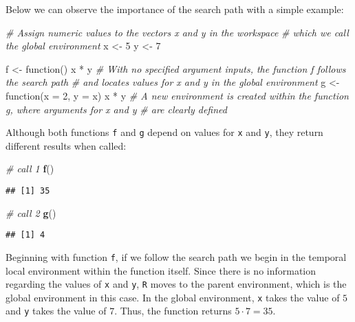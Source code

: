 \documentclass[11,]{article}
\newenvironment{Shaded}{\begin{snugshade}}{\end{snugshade}}
\newcommand{\KeywordTok}[1]{\textcolor[rgb]{0.13,0.29,0.53}{\textbf{{#1}}}}
\newcommand{\DataTypeTok}[1]{\textcolor[rgb]{0.13,0.29,0.53}{{#1}}}
\newcommand{\DecValTok}[1]{\textcolor[rgb]{0.00,0.00,0.81}{{#1}}}
\newcommand{\StringTok}[1]{\textcolor[rgb]{0.31,0.60,0.02}{{#1}}}
\newcommand{\CommentTok}[1]{\textcolor[rgb]{0.56,0.35,0.01}{\textit{{#1}}}}
\newcommand{\NormalTok}[1]{{#1}}
\begin{document}
Below we can observe the importance of the search path with a simple
example:

\begin{Shaded}
\begin{Highlighting}[]
\CommentTok{# Assign numeric values to the vectors x and y in the workspace }
\CommentTok{# which we call the global environment}
\NormalTok{x <-}\StringTok{ }\DecValTok{5}
\NormalTok{y <-}\StringTok{ }\DecValTok{7}

\NormalTok{f <-}\StringTok{ }\NormalTok{function() x *}\StringTok{ }\NormalTok{y}
  \CommentTok{# With no specified argument inputs, the function f follows the search path}
  \CommentTok{# and locates values for x and y in the global environment}
\NormalTok{g <-}\StringTok{ }\NormalTok{function(}\DataTypeTok{x =} \DecValTok{2}\NormalTok{, }\DataTypeTok{y =} \NormalTok{x) x *}\StringTok{ }\NormalTok{y}
  \CommentTok{# A new environment is created within the function g, where arguments for x and y}
  \CommentTok{# are clearly defined}
\end{Highlighting}
\end{Shaded}

Although both functions \texttt{f} and \texttt{g} depend on values for
\texttt{x} and \texttt{y}, they return different results when called:

\begin{Shaded}
\begin{Highlighting}[]
\CommentTok{# call 1}
\KeywordTok{f}\NormalTok{()}
\end{Highlighting}
\end{Shaded}

\begin{verbatim}
## [1] 35
\end{verbatim}

\begin{Shaded}
\begin{Highlighting}[]
\CommentTok{# call 2}
\KeywordTok{g}\NormalTok{()}
\end{Highlighting}
\end{Shaded}

\begin{verbatim}
## [1] 4
\end{verbatim}

Beginning with function \texttt{f}, if we follow the search path we
begin in the temporal local environment within the function itself.
Since there is no information regarding the values of \texttt{x} and
\texttt{y}, \texttt{R} moves to the parent environment, which is the
global environment in this case. In the global environment, \texttt{x}
takes the value of \(5\) and \texttt{y} takes the value of \(7\). Thus,
the function returns \(5 \cdot 7=35\).
\end{document}
